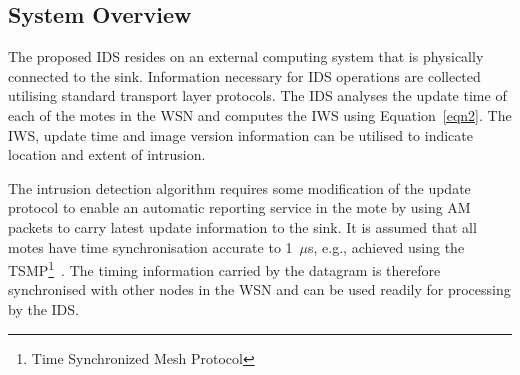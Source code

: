 \documentclass[conference]{IEEEtran}
\newcommand{\notedme}[1]{\raisebox{0pt}[0pt][0pt]{\pdfcomment[open=true,color=blue]{#1}}}
\begin{document}



\subsection*{System Overview}
\label{subsec:sysdeg}
The proposed IDS resides on an external computing system that is physically connected to the sink.
Information necessary for IDS operations are collected utilising standard transport layer protocols. 
The IDS analyses the update time of  each of the motes in the WSN and computes the IWS using Equation~\ref{eqn2}.
The IWS, update time and image version information can be utilised to indicate location and extent of intrusion. 

The intrusion detection algorithm requires some modification of the update protocol to enable an automatic reporting service in the mote by using AM packets to carry latest update information to the sink.
It is assumed that all motes have time synchronisation accurate to 1~$\mu$s, e.g., achieved using the TSMP\footnote{Time Synchronized Mesh Protocol}~\cite{Pister08tsmp:time}.
The timing information carried by the datagram is therefore synchronised with other nodes in the WSN and can be used readily for processing by the IDS.
\end{document}
